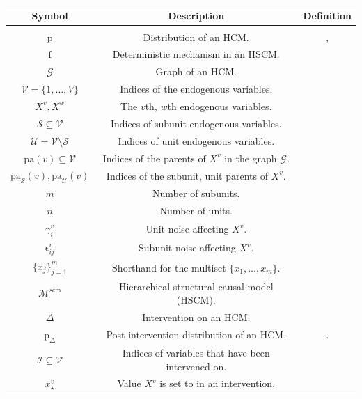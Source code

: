 \documentclass[12pt]{article}
\newcommand{\Sc}{\mathcal{S}}
\newcommand{\Uc}{\mathcal{U}}
\newcommand{\pa}{\mathrm{pa}}
\newcommand{\pr}{\mathrm{p}}
\newcommand{\f}{\mathrm{f}}
\newcommand{\Mc}{\mathcal{M}}
\newcommand{\scm}{\mathrm{scm}}
\begin{document}
\begin{table}[h!]
\centering
\begin{tabular}{c c c}
	\textbf{Symbol} & \textbf{Description} & \textbf{Definition}\\
	\hline\\
	$\pr$ & Distribution of an HCM. & \Cref{def:hscm}, \Cref{def:hcgm}\\
	$\f$ & Deterministic mechanism in an HSCM. & \Cref{def:hscm}\\
	$\mathcal{G}$ & Graph of an HCM. & \Cref{def:hscm} \\
	$\mathcal{V} = \{1, \ldots, V\}$ & Indices of the endogenous variables. & \Cref{sec:general-hscm}\\
	$X^v, X^w$ & The $v$th, $w$th endogenous variables. & \Cref{sec:general-hscm} \\
	$\Sc \subseteq \mathcal{V}$ & Indices of subunit endogenous variables. & \Cref{sec:general-hscm} \\
	$\Uc = \mathcal{V} \setminus \Sc$ & Indices of unit endogenous variables. & \Cref{sec:general-hscm} \\
	$\pa(v) \subseteq \mathcal{V}$ & Indices of the parents of $X^v$ in the graph $\mathcal{G}$. & \Cref{sec:general-hscm} \\
	$\pa_\Sc(v), \pa_\Uc(v)$ & Indices of the subunit, unit parents of $X^v$. & \Cref{sec:general-hscm} \\
	$m$ & Number of subunits. & \Cref{def:hscm}\\
	$n$ & Number of units. & \Cref{def:hscm}\\
	$\gamma_i^v$ & Unit noise affecting $X^v$. & \Cref{def:hscm} \\
	$\epsilon_{ij}^v$ & Subunit noise affecting $X^v$. & \Cref{def:hscm} \\
	$\{x_{j}\}_{j=1}^m$ & Shorthand for the multiset $\{x_{1}, \ldots, x_m\}$. & \Cref{sec:hscm-intro} \\
	$\Mc^\scm$ & Hierarchical structural causal model (HSCM). & \Cref{def:hscm} \\
	$\Delta$ & Intervention on an HCM. & \Cref{def:intervention} \\
	$\pr_{\Delta}$ & Post-intervention distribution of an HCM. & \Cref{thm:valid_collapse}.\\
	$\mathcal{I} \subseteq \mathcal{V}$ & Indices of variables that have been intervened on. & \Cref{def:intervention} \\
	$x_\star^v$ & Value $X^v$ is set to in an intervention. & \Cref{def:intervention} \\ 

\end{tabular}
\end{table}
\end{document}

